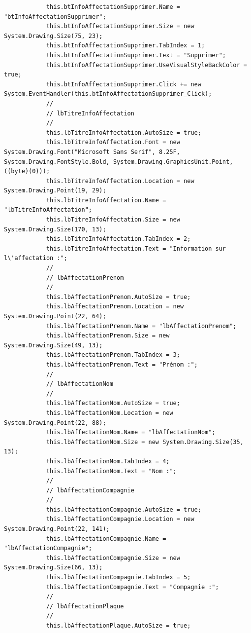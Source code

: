 \documentclass[main.tex]{subfiles}
\begin{document}
\begin{lstlisting}
            this.btInfoAffectationSupprimer.Name = "btInfoAffectationSupprimer";
            this.btInfoAffectationSupprimer.Size = new System.Drawing.Size(75, 23);
            this.btInfoAffectationSupprimer.TabIndex = 1;
            this.btInfoAffectationSupprimer.Text = "Supprimer";
            this.btInfoAffectationSupprimer.UseVisualStyleBackColor = true;
            this.btInfoAffectationSupprimer.Click += new System.EventHandler(this.btInfoAffectationSupprimer_Click);
            // 
            // lbTitreInfoAffectation
            // 
            this.lbTitreInfoAffectation.AutoSize = true;
            this.lbTitreInfoAffectation.Font = new System.Drawing.Font("Microsoft Sans Serif", 8.25F, System.Drawing.FontStyle.Bold, System.Drawing.GraphicsUnit.Point, ((byte)(0)));
            this.lbTitreInfoAffectation.Location = new System.Drawing.Point(19, 29);
            this.lbTitreInfoAffectation.Name = "lbTitreInfoAffectation";
            this.lbTitreInfoAffectation.Size = new System.Drawing.Size(170, 13);
            this.lbTitreInfoAffectation.TabIndex = 2;
            this.lbTitreInfoAffectation.Text = "Information sur l\'affectation :";
            // 
            // lbAffectationPrenom
            // 
            this.lbAffectationPrenom.AutoSize = true;
            this.lbAffectationPrenom.Location = new System.Drawing.Point(22, 64);
            this.lbAffectationPrenom.Name = "lbAffectationPrenom";
            this.lbAffectationPrenom.Size = new System.Drawing.Size(49, 13);
            this.lbAffectationPrenom.TabIndex = 3;
            this.lbAffectationPrenom.Text = "Prénom :";
            // 
            // lbAffectationNom
            // 
            this.lbAffectationNom.AutoSize = true;
            this.lbAffectationNom.Location = new System.Drawing.Point(22, 88);
            this.lbAffectationNom.Name = "lbAffectationNom";
            this.lbAffectationNom.Size = new System.Drawing.Size(35, 13);
            this.lbAffectationNom.TabIndex = 4;
            this.lbAffectationNom.Text = "Nom :";
            // 
            // lbAffectationCompagnie
            // 
            this.lbAffectationCompagnie.AutoSize = true;
            this.lbAffectationCompagnie.Location = new System.Drawing.Point(22, 141);
            this.lbAffectationCompagnie.Name = "lbAffectationCompagnie";
            this.lbAffectationCompagnie.Size = new System.Drawing.Size(66, 13);
            this.lbAffectationCompagnie.TabIndex = 5;
            this.lbAffectationCompagnie.Text = "Compagnie :";
            // 
            // lbAffectationPlaque
            // 
            this.lbAffectationPlaque.AutoSize = true;

\end{lstlisting}
\end{document}
